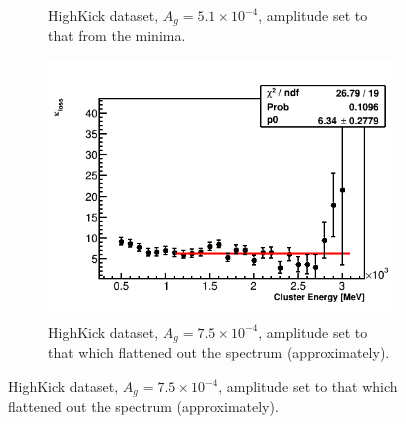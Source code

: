 \begin{landscape}
\begin{figure}[h]
\begin{subfigure}[t]{0.34\textwidth}
        \caption{HighKick dataset, $A_{g} = 5.1 \times 10^{-4}$, amplitude set to that from the \chisq minima.}
    \end{subfigure}
    \hspace{1cm}
    \begin{subfigure}[t]{0.34\textwidth}
        \centering
        \includegraphics[width=\textwidth]{TMethod_kappa_loss_Vs_EBin_Canv_HK-7p5}
        \caption{HighKick dataset, $A_{g} = 7.5 \times 10^{-4}$, amplitude set to that which flattened out the \K spectrum (approximately).}
    \end{subfigure}


\end{figure}
\end{landscape}
